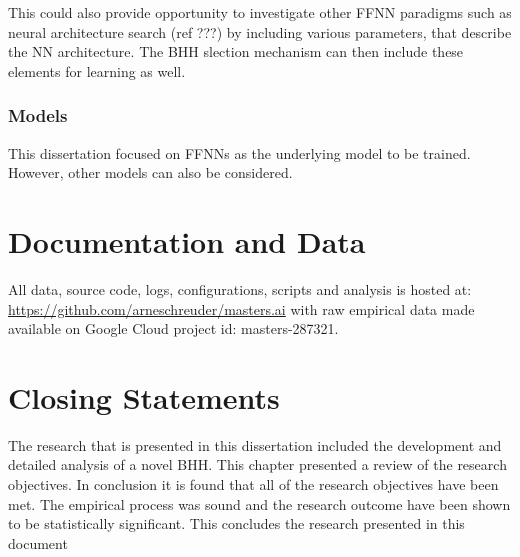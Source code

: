 This could also provide opportunity to investigate other \ac{FFNN} paradigms such as neural architecture search (ref ???) by including various parameters, that describe the \ac{NN} architecture. The \ac{BHH} slection mechanism can then include these elements for learning as well.

\subsubsection{Models}

This dissertation focused on \acp{FFNN} as the underlying model to be trained. However, other models can also be considered.


\section{Documentation and Data}
\label{sec:conclusion:documentation_and_data}

All data, source code, logs, configurations, scripts and analysis is hosted at: \url{https://github.com/arneschreuder/masters.ai} with raw empirical data made available on Google Cloud project id: masters-287321.


\section{Closing Statements}
\label{sec:conclusion:closing_statements}

The research that is presented in this dissertation included the development and detailed analysis of a novel \ac{BHH}. This chapter presented a review of the research objectives. In conclusion it is found that all of the research objectives have been met. The empirical process was sound and the research outcome have been shown to be statistically significant. This concludes the research presented in this document
